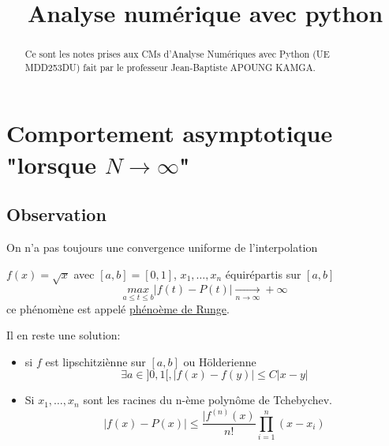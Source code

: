 \documentclass[a4paper]{report}
\title{Analyse numérique avec python}
\begin{document}
\maketitle
\begin{abstract}
   Ce sont les notes prises aux CMs d'Analyse Numériques avec Python (UE MDD253DU) fait par le professeur Jean-Baptiste APOUNG KAMGA.
\end{abstract}
\tableofcontents






\section{Comportement asymptotique "lorsque $N \to \infty$"}
\subsection{Observation}
On n'a pas toujours une convergence uniforme de l'interpolation
\begin{eg}
    $f(x) = \sqrt{x}$ avec $[a, b] = [0, 1]$,  $x_1, \ldots, x_n$ équirépartis sur $[a, b]$ 
    \[
        \underset{a \le t \le b}{max}|f(t) - P(t)| \xrightarrow[n \to \infty]{} +\infty
    \] 
    ce phénomène est appelé \underline{phénoème de Runge}.
\end{eg}

Il en reste une solution: 
\begin{itemize}
    \item si $f$ est lipschitziènne sur  $[a, b]$ ou Hölderienne 
         \[
             \exists a \in ]0, 1[, |f(x) - f(y)| \le C|x - y|
        \] 
    \item Si $x_1, \ldots, x_n$ sont les racines du n-ème polynôme de Tchebychev.
        \[
            |f(x) - P(x)| \le \frac{|f^{(n)}(x)}{n!}\prod_{i=1}^{n} (x - x_i)  
        \] 
\end{itemize}
\end{document}

